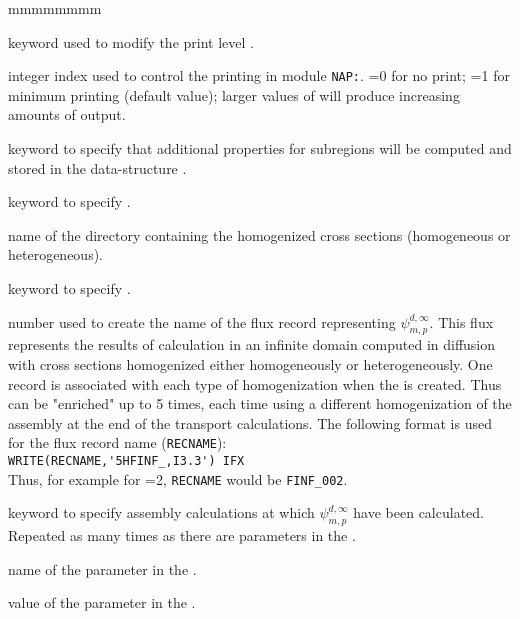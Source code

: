 \begin{ListeDeDescription}{mmmmmmmm}

\item[\moc{EDIT}] keyword used to modify the print level .

\item[\dusa{iprint}] integer index used to control  the printing in module {\tt NAP:}.
=0 for no print; =1 for minimum printing (default value); larger values of 
will produce increasing amounts of output.

\item[\moc{PROJECTION}] keyword to specify that additional properties for subregions will be computed and stored in the  data-structure .

\item[\moc{STEP}] keyword to specify . 

\item[\dusa{namedir}] name of the directory containing the homogenized cross sections (homogeneous or heterogeneous). 

\item[\moc{IFX}] keyword to specify . 

\item[\dusa{ifx}] number used to create the name of the flux record representing $\psi_{m,p}^{d,\infty}$. This flux represents the results of calculation in an infinite domain computed in diffusion with cross sections homogenized either homogeneously or heterogeneously. One record is associated with each type of homogenization when the  is created. Thus  can be "enriched" up to 5 times, each time using a different homogenization of the assembly at the end of the transport calculations. The following format is used for the flux record name (\verb+RECNAME+): \\
\verb+WRITE(RECNAME,'5HFINF_,I3.3') IFX+\\
Thus, for example for =2, \verb+RECNAME+ would be \verb+FINF_002+.

\item[\moc{SET}] keyword to specify assembly calculations at which $\psi_{m,p}^{d,\infty}$ have been calculated. Repeated as many times as there are parameters in the .

\item[\dusa{pname}] name of the parameter in the . 

\item[\dusa{pvalue}] value of the parameter in the . 

\end{ListeDeDescription}

